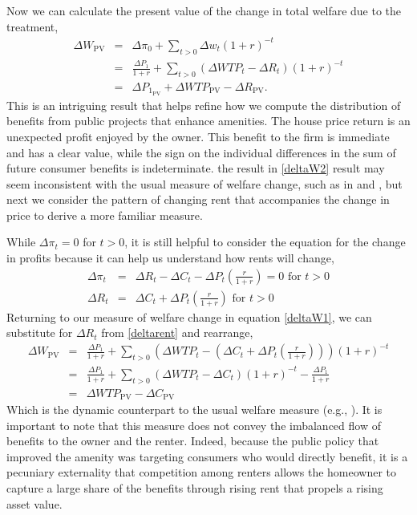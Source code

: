 \documentclass[ecta,nameyear,draft]{econsocart}
\theoremstyle{plain}
\theoremstyle{remark}
\begin{document}
Now we can calculate the present value of the change in total welfare due to the treatment,
\begin{eqnarray}
	\Delta W_{\mathrm{PV}}&=&\Delta \pi_0+\sum_{t>0}\Delta w_t(1+r)^{-t}\nonumber\\
	&=&\frac{\Delta P_1}{1+r}+\sum_{t>0} (\Delta \mathit{WTP}_t-\Delta R_t)(1+r)^{-t} \label{deltaW1}\\
	&=&\Delta P_{1_{\mathrm{PV}}}+\Delta\mathit{WTP}_\mathrm{PV}-\Delta R_{\mathrm{PV}}.\label{deltaW2}
\end{eqnarray}
This is an intriguing result that helps refine how we compute the distribution of benefits from public projects that enhance amenities. The house price return is an unexpected profit enjoyed by the owner. This benefit to the firm is immediate and has a clear value, while the sign on the individual differences in the sum of future consumer benefits is indeterminate. the result in \ref{deltaW2} result may seem inconsistent with the usual measure of welfare change, such as in \cite{freeman14} and \cite{banzhaf20}, but next we consider the pattern of changing rent that accompanies the change in price to derive a more familiar measure. 

While $\Delta\pi_t=0$ for $t>0$, it is still helpful to consider the equation for the change in profits because it can help us understand how rents will change,
\begin{eqnarray}
	\Delta \pi_t &=& \Delta R_t-\Delta C_t-\Delta P_t\left(\frac{r}{1+r}\right)=0 \text{ for } t>0\nonumber\\
	\Delta R_t &=& \Delta C_t+\Delta P_t \left(\frac{r}{1+r}\right)  \text{ for } t>0\label{deltarent}
\end{eqnarray}
Returning to our measure of welfare change in equation \ref{deltaW1}, we can substitute for $\Delta R_t$  from \ref{deltarent} and rearrange,
\begin{eqnarray}
	\Delta W_{\mathrm{PV}}&=&\frac{\Delta P_1}{1+r}+\sum_{t>0} \left(\Delta \mathit{WTP}_t-\left(\Delta C_t+\Delta P_t \left(\frac{r}{1+r}\right)\right)\right)(1+r)^{-t} \nonumber\\
	&=&\frac{\Delta P_1}{1+r}+\sum_{t>0} (\Delta \mathit{WTP}_t-\Delta C_t)(1+r)^{-t}-\frac{\Delta P_1}{1+r}\nonumber\\
	&=&\Delta \mathit{WTP}_{\mathrm{PV}}-\Delta C_{\mathrm{PV}}\nonumber %
\end{eqnarray}
Which is the dynamic counterpart to the usual welfare measure (e.g., \cite{freeman14}). It is important to note that this measure does not convey the imbalanced flow of benefits to the owner and the renter. Indeed, because the public policy that improved the amenity was targeting consumers who would directly benefit, it is a pecuniary externality that competition among renters allows the homeowner to capture a large share of the benefits through rising rent that propels a rising asset value.
\end{document}
